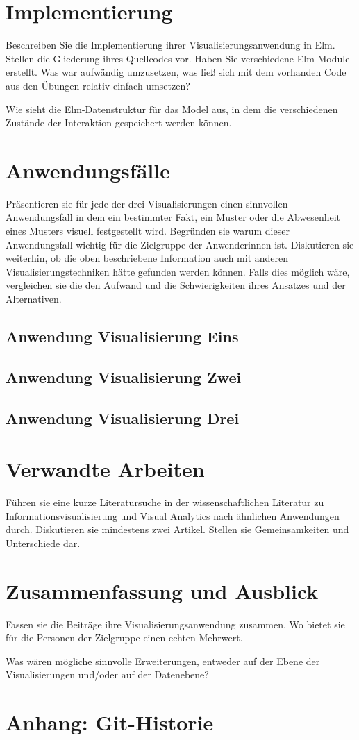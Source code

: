 \documentclass[usegeometry=true]{scrartcl}
\begin{document}
\section{Implementierung}
Beschreiben Sie die Implementierung ihrer Visualisierungsanwendung in Elm. Stellen die Gliederung ihres Quellcodes vor. Haben Sie verschiedene Elm-Module erstellt. Was war aufwändig umzusetzen, was ließ sich mit dem vorhanden Code aus den Übungen relativ einfach umsetzen? 

Wie sieht die Elm-Datenstruktur für das Model aus, in dem die verschiedenen Zustände der Interaktion gespeichert werden können.

\section{Anwendungsfälle}
Präsentieren sie für jede der drei Visualisierungen einen sinnvollen Anwendungsfall 
in dem ein bestimmter Fakt, ein Muster oder die Abwesenheit eines Musters visuell festgestellt wird.
Begründen sie warum dieser Anwendungsfall wichtig für die Zielgruppe der Anwenderinnen ist.
Diskutieren sie weiterhin, ob die oben beschriebene Information auch mit anderen 
Visualisierungstechniken hätte gefunden werden können.
Falls dies möglich wäre, vergleichen sie die den Aufwand und die Schwierigkeiten ihres Ansatzes und der Alternativen. 
\subsection{Anwendung Visualisierung Eins}

\subsection{Anwendung Visualisierung Zwei}
\subsection{Anwendung Visualisierung Drei}

\section{Verwandte Arbeiten}
Führen sie eine kurze Literatursuche in der wissenschaftlichen Literatur zu Informationsvisualisierung und Visual Analytics nach ähnlichen Anwendungen durch. Diskutieren sie mindestens zwei Artikel. Stellen sie Gemeinsamkeiten und Unterschiede dar.

\section{Zusammenfassung und Ausblick}
Fassen sie die Beiträge ihre Visualisierungsanwendung zusammen. Wo bietet sie für die Personen der Zielgruppe einen echten Mehrwert.

Was wären mögliche sinnvolle Erweiterungen, entweder auf der Ebene der Visualisierungen und/oder auf der Datenebene?

\section*{Anhang: Git-Historie}

\printbibliography
\end{document}
